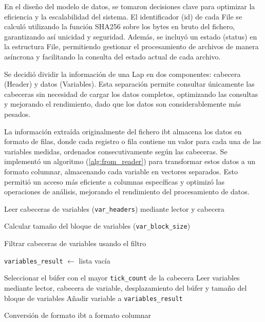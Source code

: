 En el diseño del modelo de datos, se tomaron decisiones clave para optimizar la eficiencia y la escalabilidad del sistema. El identificador (id) de cada File se calculó utilizando la función SHA256 sobre los bytes en bruto del fichero, garantizando así unicidad y seguridad. Además, se incluyó un estado (status) en la estructura File, permitiendo gestionar el procesamiento de archivos de manera asíncrona y facilitando la consulta del estado actual de cada archivo.

Se decidió dividir la información de una Lap en dos componentes: cabecera (Header) y datos (Variables). Esta separación permite consultar únicamente las cabeceras sin necesidad de cargar los datos completos, optimizando las consultas y mejorando el rendimiento, dado que los datos son considerablemente más pesados.

La información extraída originalmente del fichero \ac{ibt} almacena los datos en formato de filas, donde cada registro o fila contiene un valor para cada una de las variables medidas, ordenados consecutivamente según las cabeceras. Se implementó un algoritmo (\autoref{alg:from_reader}) para transformar estos datos a un formato columnar, almacenando cada variable en vectores separados. Esto permitió un acceso más eficiente a columnas específicas y optimizó las operaciones de análisis, mejorando el rendimiento del procesamiento de datos.

\IncMargin{1em}
\begin{algorithm}[H]
\LinesNumbered
\SetAlgoLined



 {
    Leer cabeceras de variables (\texttt{var\_headers}) mediante lector y cabecera\;
    
    Calcular tamaño del bloque de variables (\texttt{var\_block\_size})\;

     {
        Filtrar cabeceras de variables usando el filtro\;
    }

    \texttt{variables\_result} $\leftarrow$ lista vacía\;

     {
        Seleccionar el búfer con el mayor \texttt{tick\_count} de la cabecera\;
        Leer variables mediante lector, cabecera de variable, desplazamiento del búfer y tamaño del bloque de variables\;
        Añadir variable a \texttt{variables\_result}\;
    }

    \;
}
\caption{Conversión de formato \ac{ibt} a formato columnar}\label{alg:from_reader}
\end{algorithm}
\DecMargin{1em}


